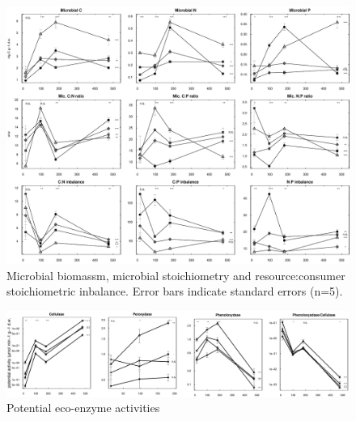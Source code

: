 \documentclass[authoryear,preprint,review,12pt]{elsarticle}
\begin{document}
\newpage
\begin{figure}[h!s]
\vspace*{2mm}
\begin{center}
\includegraphics{sbb-mb}
\end{center}
\caption{Microbial biomassm, microbial stoichiometry and resource:consumer stoichiometric inbalance. Error bars indicate standard errors (n=5).}
\label{fig:mb}
\end{figure}






\newpage
\begin{figure}[h!]
\vspace*{2mm}
\begin{center}
\includegraphics{sbb-enz}
\end{center}
\caption{Potential eco-enzyme activities}
\label{fig:enz}
\end{figure}
\end{document}
